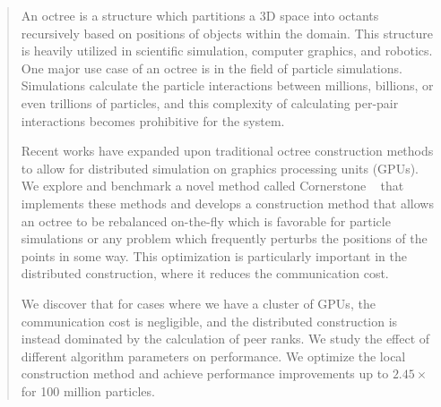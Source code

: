 \begin{abstract}

An octree is a structure which partitions a 3D space into octants recursively based on positions of objects within the domain. This structure is heavily utilized in scientific simulation, computer graphics, and robotics. One major use case of an octree is in the field of particle simulations. Simulations calculate the particle interactions between millions, billions, or even trillions of particles, and this complexity of calculating per-pair interactions becomes prohibitive for the system.

Recent works have expanded upon traditional octree construction methods to allow for distributed simulation on graphics processing units (GPUs). We explore and benchmark a novel method called Cornerstone ~\cite{cornerstone} that implements these methods and develops a construction method that allows an octree to be rebalanced on-the-fly which is favorable for particle simulations or any problem which frequently perturbs the positions of the points in some way. This optimization is particularly important in the distributed construction, where it reduces the communication cost.

We discover that for cases where we have a cluster of GPUs, the communication cost is negligible, and the distributed construction is instead dominated by the calculation of peer ranks. We study the effect of different algorithm parameters on performance. We optimize the local construction method and achieve performance improvements up to $2.45 \times$ for 100 million particles.

\end{abstract}
